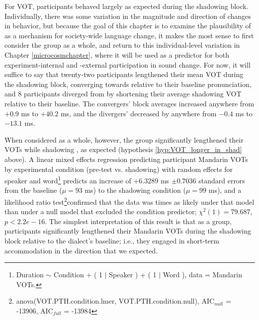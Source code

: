     For VOT, participants behaved largely as expected during the shadowing block. Individually, there was some variation in the magnitude and direction of changes in behavior, but because the goal of this chapter is to examine the plausibility of \cbat{} as a mechanism for society-wide language change, it makes the most sense to first consider the group as a whole, and return to this individual-level variation in Chapter \ref{microcosmchapter}, where it will be used as a predictor for both experiment-internal and -external participation in sound change. For now, it will suffice to say that twenty-two participants lengthened their mean VOT during the shadowing block, converging towards \annie{} relative to their baseline pronunciation, and 8 participants diverged from \annie{} by shortening their average shadowing VOT relative to their baseline. The convergers' block averages increased anywhere from $+0.9$ ms to $+40.2$ ms, and the divergers' decreased by anywhere from $-0.4$ ms to $-13.1$ ms. %
    
    When considered as a whole, however, the group significantly lengthened their VOTs while shadowing \annie{}, as expected (hypothesis \ref{hyp:VOT_longer_in_shad} above). A linear mixed effects regression predicting participant Mandarin VOTs by experimental condition (pre-test vs. shadowing) with random effects for speaker and word\footnote{Duration $\sim$ Condition + ( 1 $|$ Speaker ) + ( 1 $|$ Word ), data = Mandarin VOTs.} predicts an increase of $+6.3289$ ms $\pm 0.7036$ standard errors from the baseline ($\mu = 93$ ms) to the shadowing condition ($\mu = 99$ ms), and a likelihood ratio test\footnote{anova(VOT.PTH.condition.lmer, VOT.PTH.condition.null), AIC$_{null}$ = -13906, AIC$_{full}$ = -13984}confirmed that the data was \xxxxx{} times as likely under that model than under a null model that excluded the condition predictor; $\chi^2 (1) = 79.687$, $p < 2.2e-16$. %
    The simplest interpretation of this result is that as a group, participants significantly lengthened their Mandarin VOTs during the shadowing block relative to the dialect's baseline; i.e., they engaged in short-term accommodation in the direction that we expected.
    
